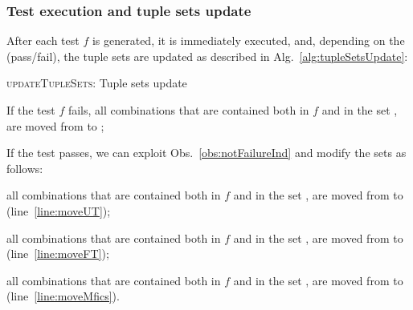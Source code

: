 \begin{tikzborder}{\cite{Gargantini16:validation}}
\begin{tikzborder}{\cite{gargantini_combinatorial_2017}}
\begin{tikzborder}{\cite{garn2019}}
\begin{tikzborder}{\cite{arcaini2019achieving}}
\subsubsection{Test execution and tuple sets update}

\begin{tikzborder}{}
After each test $f$ is generated, it is immediately executed, and, depending on the \result (pass/fail), the tuple sets are updated as described in Alg.~\ref{alg:tupleSetsUpdate}:
\end{tikzborder}
%
\begin{algorithm}[!htb]
	\begin{algorithmic}[1]
		\Else
		\label{line:moveUT}
		\label{line:moveFT}
		\label{line:moveMfics}
		\EndIf
		
		\vspace{10pt}
		\State{$\sourceSet \gets \sourceSet \setminus \toMove$}
		\State{$\destSet \gets \destSet \cup \toMove$}
		\EndProcedure
	\end{algorithmic}
	\caption{\textsc{updateTupleSets}: Tuple sets update}
	\label{alg:tupleSetsUpdate}
\end{algorithm}
%
\begin{tikzborder}{}
\begin{compactenum}
	\item If the test $f$ fails, all combinations that are contained both in $f$ and in the set \ut, are moved from \ut to \ft;
	\item If the test passes, we can exploit Obs.~\ref{obs:notFailureInd} and modify the sets as follows:
	\begin{compactenum}
		\item all combinations that are contained both in $f$ and in the set \ut, are moved from \ut to \pt (line~\ref{line:moveUT});
		\item all combinations that are contained both in $f$ and in the set \ft, are moved from \ft to \pt (line~\ref{line:moveFT});
		\item all combinations that are contained both in $f$ and in the set \isoMficsSet, are moved from \isoMficsSet to \pt (line~\ref{line:moveMfics}).
	\end{compactenum}
\end{compactenum}


\end{tikzborder}
\end{tikzborder}
\end{tikzborder}
\end{tikzborder}
\end{tikzborder}
